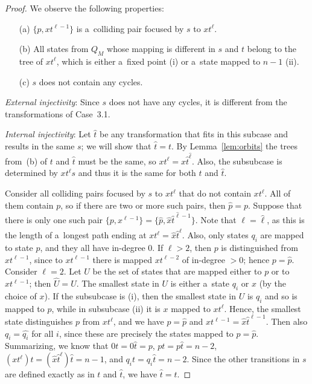 \documentclass{amsart}
\newcommand{\e}[1]{\hat{#1}}
\begin{document}
\begin{proof}
We observe the following properties:
\begin{enumerate}
\item[(a)] $\{p, xt^{\ell-1}\}$ is a~colliding pair focused by $s$ to $xt^\ell$.

\item[(b)] All states from $Q_M$ whose mapping is different in $s$ and $t$ belong to the tree of $xt^\ell$,
which is either a~fixed point (i) or a~state mapped to $n-1$ (ii).

\item[(c)] $s$ does not contain any cycles.
\end{enumerate}

\textit{External injectivity}:
Since $s$ does not have any cycles, it is different from the transformations of Case~3.1.

\textit{Internal injectivity}:
Let $\e{t}$ be any transformation that fits in this subcase and results in the same $s$; we will show that $\e{t}=t$.
By Lemma~\ref{lem:orbits} the trees from~(b) of $t$ and $\e{t}$ must be the same, so $xt^\ell = \e{x}\e{t}^{\e{\ell}}$.
Also, the subsubcase is determined by $xt^\ell s$ and thus it is the same for both $t$ and $\e{t}$.

Consider all colliding pairs focused by $s$ to $xt^\ell$ that do not contain $xt^\ell$.
All of them contain $p$, so if there are two or more such pairs, then $\e{p} = p$.
Suppose that there is only one such pair $\{p,x^{\ell-1}\} = \{\e{p},\e{x}\e{t}^{\e{\ell}-1}\}$.
Note that $\ell = \e{\ell}$, as this is the length of a~longest path ending at $xt^{\ell} = \e{x}\e{t}^{\e{\ell}}$.
Also, only states $q_i$ are mapped to state $p$, and they all have in-degree 0.
If $\ell > 2$, then $p$ is distinguished from $xt^{\ell-1}$, since to $xt^{\ell-1}$ there is mapped $xt^{\ell-2}$ of in-degree $>0$; hence $p = \e{p}$.
Consider $\ell = 2$.
Let $U$ be the set of states that are mapped either to $p$ or to $xt^{\ell-1}$; then $\e{U} = U$.
The smallest state in $U$ is either a~state $q_i$ or $x$ (by the choice of $x$).
If the subsubcase is (i), then the smallest state in $U$ is $q_i$ and so is mapped to $p$, while in subsubcase (ii) it is $x$ mapped to $xt^{\ell}$.
Hence, the smallest state distinguishes $p$ from $xt^{\ell}$, and we have $p = \e{p}$ and $xt^{\ell-1} = \e{x}\e{t}^{\ell-1}$.
Then also $q_i = \e{q_i}$ for all $i$, since these are precisely the states mapped to $p = \e{p}$.
Summarizing, we know that $0t = 0\e{t} = p$, $pt = p\e{t} = n-2$, $(xt^\ell)t = (\e{x}\e{t}^{\ell})\e{t} = n-1$, and $q_i t = q_i \e{t} = n-2$.
Since the other transitions in $s$ are defined exactly as in $t$ and $\e{t}$, we have $\e{t}=t$.


\end{proof}
\end{document}

